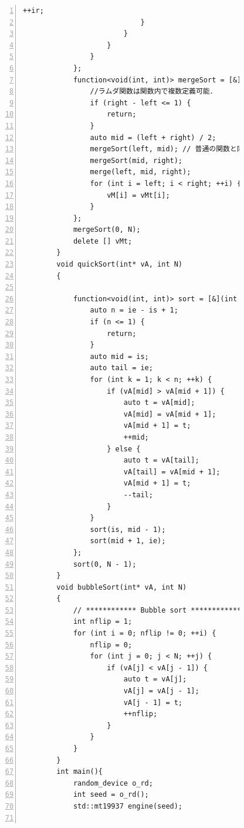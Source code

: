 \documentclass[fleqn, a4paper. 12pt]{ltjsarticle} %
\begin{document}
\begin{figure}[b]
\begin{lstlisting}[mathescape=true, numbers=left]
                                ++ir;
                            }
                        }
                    }
                }
            };
            function<void(int, int)> mergeSort = [&](int left, int right) {
                //ラムダ関数は関数内で複数定義可能．
                if (right - left <= 1) {
                    return;
                }
                auto mid = (left + right) / 2;
                mergeSort(left, mid); // 普通の関数と同じように，ラムダ関数を呼び出し可能．ただし，宣言された関数（スコープ）外からラムダ関数を呼び出すことはできない．この性質はローカル変数と同じものである．ラムダ関数の枠組みでは関数を変数のように扱うことが可能となっている．
                mergeSort(mid, right);
                merge(left, mid, right);
                for (int i = left; i < right; ++i) {
                    vM[i] = vMt[i];
                }
            };
            mergeSort(0, N);
            delete [] vMt;
        }
        void quickSort(int* vA, int N)
        {
        
            function<void(int, int)> sort = [&](int is, int ie) {
                auto n = ie - is + 1;
                if (n <= 1) {
                    return;
                }
                auto mid = is;
                auto tail = ie;
                for (int k = 1; k < n; ++k) {
                    if (vA[mid] > vA[mid + 1]) {
                        auto t = vA[mid];
                        vA[mid] = vA[mid + 1];
                        vA[mid + 1] = t;
                        ++mid;
                    } else {
                        auto t = vA[tail];
                        vA[tail] = vA[mid + 1];
                        vA[mid + 1] = t;
                        --tail;
                    }
                }
                sort(is, mid - 1);
                sort(mid + 1, ie);
            };
            sort(0, N - 1);
        }
        void bubbleSort(int* vA, int N)
        {
            // ************ Bubble sort *****************
            int nflip = 1;
            for (int i = 0; nflip != 0; ++i) {
                nflip = 0;
                for (int j = 0; j < N; ++j) {
                    if (vA[j] < vA[j - 1]) {
                        auto t = vA[j];
                        vA[j] = vA[j - 1];
                        vA[j - 1] = t;
                        ++nflip;
                    }
                }
            }
        }
        int main(){
            random_device o_rd;
            int seed = o_rd();
            std::mt19937 engine(seed);
        

\end{lstlisting}
\end{figure}
\end{document}
